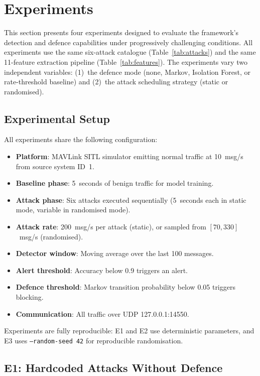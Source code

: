 \section{Experiments} \label{sec:experiments}

This section presents four experiments designed to evaluate the framework's detection and defence capabilities under progressively challenging conditions.
All experiments use the same six-attack catalogue (Table~\ref{tab:attacks}) and the same 11-feature extraction pipeline (Table~\ref{tab:features}).
The experiments vary two independent variables: (1)~the defence mode (none, Markov, Isolation Forest, or rate-threshold baseline) and (2)~the attack scheduling strategy (static or randomised).

\subsection{Experimental Setup}

All experiments share the following configuration:
\begin{itemize}
    \item \textbf{Platform}: MAVLink SITL simulator emitting normal traffic at 10~msg/s from source system ID~1.
    \item \textbf{Baseline phase}: 5~seconds of benign traffic for model training.
    \item \textbf{Attack phase}: Six attacks executed sequentially (5~seconds each in static mode, variable in randomised mode).
    \item \textbf{Attack rate}: 200~msg/s per attack (static), or sampled from $[70, 330]$~msg/s (randomised).
    \item \textbf{Detector window}: Moving average over the last 100 messages.
    \item \textbf{Alert threshold}: Accuracy below 0.9 triggers an alert.
    \item \textbf{Defence threshold}: Markov transition probability below 0.05 triggers blocking.
    \item \textbf{Communication}: All traffic over UDP 127.0.0.1:14550.
\end{itemize}

Experiments are fully reproducible: E1 and E2 use deterministic parameters, and E3 uses \texttt{--random-seed 42} for reproducible randomisation.

\subsection{E1: Hardcoded Attacks Without Defence}


